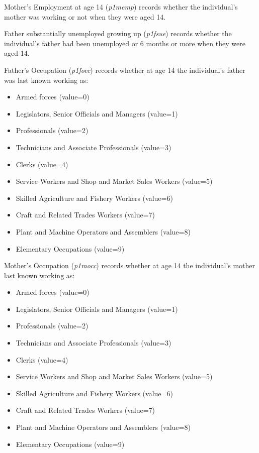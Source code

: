 \documentclass[12pt, a4paper]{article}
\begin{document}
Mother’s Employment at age 14 (\textit{p1\textunderscore{}memp}) records whether the individual’s mother was working or not when they were aged 14.

Father substantially unemployed growing up (\textit{p1\textunderscore{}fsue}) records whether the individual’s father had been unemployed or 6 months or more when they were aged 14. 

Father’s Occupation (\textit{p1\textunderscore{}focc}) records whether at age 14 the individual’s father was last known working as:
\begin{itemize}
  \item Armed forces (value=0)
  \item Legislators, Senior Officials and Managers (value=1)
  \item Professionals (value=2)
  \item Technicians and Associate Professionals (value=3)
  \item Clerks (value=4)
  \item Service Workers and Shop and Market Sales Workers (value=5)
  \item Skilled Agriculture and Fishery Workers (value=6)
  \item Craft and Related Trades Workers (value=7)
  \item Plant and Machine Operators and Assemblers (value=8)
  \item Elementary Occupations (value=9)
\end{itemize}  

Mother’s Occupation (\textit{p1\textunderscore{}mocc}) records whether at age 14 the individual’s mother last known working as:
\begin{itemize}
  \item Armed forces (value=0)
  \item Legislators, Senior Officials and Managers (value=1)
  \item Professionals (value=2)
  \item Technicians and Associate Professionals (value=3)
  \item Clerks (value=4)
  \item Service Workers and Shop and Market Sales Workers (value=5)
  \item Skilled Agriculture and Fishery Workers (value=6)
  \item Craft and Related Trades Workers (value=7)
  \item Plant and Machine Operators and Assemblers (value=8)
  \item Elementary Occupations (value=9)
\end{itemize}  
\end{document}
